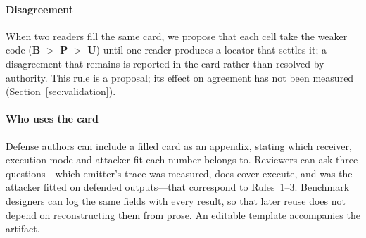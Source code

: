 \paragraph{Disagreement}
When two readers fill the same card, we propose that each cell take the weaker code (\textbf{B} $>$ \textbf{P} $>$ \textbf{U}) until one reader produces a locator that settles it; a disagreement that remains is reported in the card rather than resolved by authority. This rule is a proposal; its effect on agreement has not been measured (Section~\ref{sec:validation}).

\paragraph{Who uses the card}
Defense authors can include a filled card as an appendix, stating which receiver, execution mode and attacker fit each number belongs to. Reviewers can ask three questions---which emitter's trace was measured, does cover execute, and was the attacker fitted on defended outputs---that correspond to Rules~1--3. Benchmark designers can log the same fields with every result, so that later reuse does not depend on reconstructing them from prose. An editable template accompanies the artifact.
